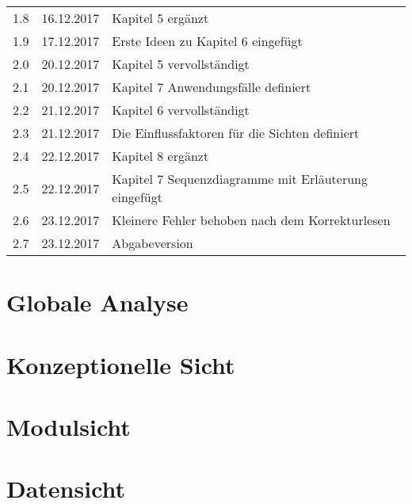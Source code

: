 \documentclass[fontsize=12pt,paper=a4,twoside]{scrartcl}
\begin{document}
\begin{tabular}{ccl}
1.8 & 16.12.2017 & Kapitel 5 ergänzt\\
1.9 & 17.12.2017 & Erste Ideen zu Kapitel 6 eingefügt\\
2.0 & 20.12.2017 & Kapitel 5 vervollständigt\\
2.1 & 20.12.2017 & Kapitel 7 Anwendungsfälle definiert\\
2.2 & 21.12.2017 & Kapitel 6 vervollständigt\\
2.3 & 21.12.2017 & Die Einflussfaktoren für die Sichten definiert\\
2.4 & 22.12.2017 & Kapitel 8 ergänzt\\
2.5 & 22.12.2017 & Kapitel 7 Sequenzdiagramme mit Erläuterung eingefügt  \\
2.6 & 23.12.2017 & Kleinere Fehler behoben nach dem Korrekturlesen\\
2.7 & 23.12.2017 & Abgabeversion \\
\end{tabular}





\section{Globale Analyse} \label{sec:globale_analyse}



\raggedright	\section{Konzeptionelle Sicht} \label{sec:konzeptionell}
	




\newpage
\section{Modulsicht} \label{sec:modulsicht}


\section{Datensicht} \label{sec:datensicht}

\end{document}
